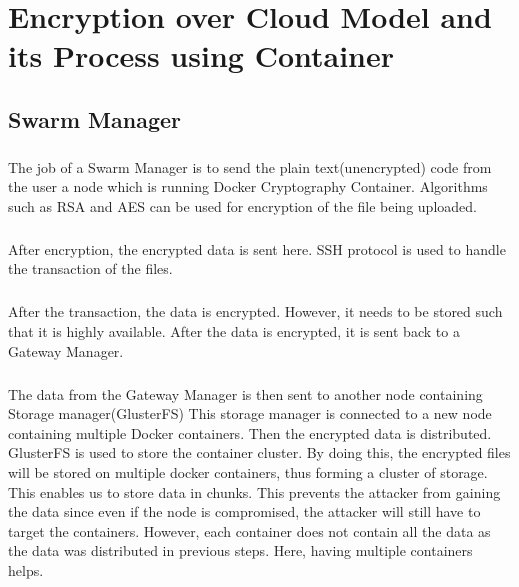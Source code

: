 \chapter{Encryption over Cloud Model and its Process using Container}

\section{Swarm Manager}

\paragraph{\hspace{24pt}}
The job of a Swarm Manager is to send the plain text(unencrypted) code from the user a node which is running Docker Cryptography Container. Algorithms such as RSA and AES can be used for encryption of the file being uploaded.

\paragraph{\hspace{24pt}}
After encryption, the encrypted data is sent here. SSH protocol is used to handle the transaction of the files.

\paragraph{\hspace{24pt}}
After the transaction, the data is encrypted. However, it needs to be stored such that it is highly available. After the data is encrypted, it is sent back to a Gateway Manager.

\paragraph{\hspace{24pt}}
The data from the Gateway Manager is then sent to another node containing Storage manager(GlusterFS) This storage manager is connected to a new node containing multiple Docker containers. Then the encrypted data is distributed. GlusterFS is used to store the container cluster. By doing this, the encrypted files will be stored on multiple docker containers, thus forming a cluster of storage. This enables us to store data in chunks. This prevents the attacker from gaining the data since even if the node is compromised, the attacker will still have to target the containers. However, each container does not contain all the data as the data was distributed in previous steps. Here, having multiple containers helps.

